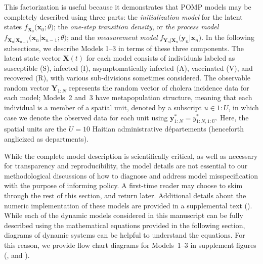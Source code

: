\documentclass[10pt,letterpaper]{article}\usepackage[]{graphicx}\usepackage[table]{xcolor}
\newcommand\paramVec{\theta}
\newcommand\seq[2]{{#1}\!:\!{#2}}
\begin{document}
\noindent This factorization is useful because it demonstrates that POMP models may be completely described using three parts: the \emph{initialization model} for the latent states $f_{\bm{X}_0}\big(\bm{x}_0;\paramVec\big)$; the \emph{one-step transition density}, or \emph{the process model} $f_{\bm{X}_n|\bm{X}_{n-1}}\big(\bm{x}_{n}|\bm{x}_{n-1}; \paramVec\big)$; and the \emph{measurement model} $f_{\bm{Y}_n|\bm{X}_{n}}\big(\bm{y}_n|\bm{x}_{n}\big)$.
In the following subsections, we describe Models 1--3 in terms of these three components.
The latent state vector $\bm{X}(t)$ for each model consists of individuals labeled as susceptible (S), infected (I), asymptomatically infected (A), vaccinated (V), and recovered (R), with various sub-divisions sometimes considered.
The observable random vector $\bm{Y}_{1:N}$ represents the random vector of cholera incidence data for each model;
Models~2 and~3 have metapopulation structure, meaning that each individual is a member of a spatial unit, denoted by a subscript $u\in \seq{1}{U}$, in which case we denote the observed data for each unit using $\bm{y}_{1:N}^* = y_{1:N,1:U}^*$.
Here, the spatial units are the $U=10$ Haitian administrative d\'{e}partements (henceforth anglicized as departments).

While the complete model description is scientifically critical, as well as necessary for transparency and reproducibility, the model details are not essential to our methodological discussions of how to diagnose and address model misspecification with the purpose of informing policy.
A first-time reader may choose to skim through the rest of this section, and return later.
Additional details about the numeric implementation of these models are provided in a supplemental text ().
While each of the dynamic models considered in this manuscript can be fully described using the mathematical equations provided in the following section, diagrams of dynamic systems can be helpful to understand the equations.
For this reason, we provide flow chart diagrams for Models~1--3 in supplement figures (,  and ).
\end{document}
